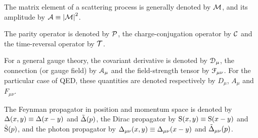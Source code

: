 The matrix element of a scattering process is generally denoted by $ \mathcal{M} $, and its amplitude by $ \mathcal{A} \equiv \left\lvert\mathcal{M}\right\rvert^2 $.

The parity operator is denoted by $ \mathcal{P} $, the charge-conjugation operator by $ \mathcal{C} $ and the time-reversal operator by $ \mathcal{T} $.

For a general gauge theory, the covariant derivative is denoted by $ \EuScript{D}_\mu $, the connection (or gauge field) by $ \EuScript{A}_\mu $ and the field-strength tensor by $ \EuScript{F}_{\mu \nu} $. For the particular case of QED, these quantities are denoted respectively by $ D_\mu $, $ A_\mu $ and $ F_{\mu \nu} $.

The Feynman propagator in position and momentum space is denoted by $ \Delta(x,y) \equiv \Delta(x - y) $ and $ \tilde{\Delta}(p) $, the Dirac propagator by $ \text{S}(x,y) \equiv \text{S}(x - y) $ and $ \tilde{\text{S}}(p) $, and the photon propagator by $ \Delta_{\mu \nu}(x,y) \equiv \Delta_{\mu \nu}(x - y) $ and $ \tilde{\Delta}_{\mu \nu}(p) $.










